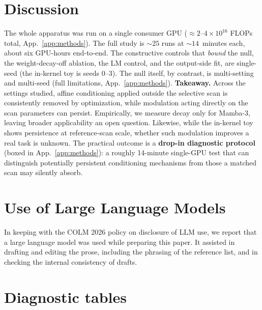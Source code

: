 \documentclass{article}
\begin{document}
\section{Discussion}\label{sec:discussion}

The whole apparatus was run on a single consumer GPU
(${\approx}2$--$4\times10^{16}$ FLOPs total, App.~\ref{app:methods}). The full
study is ${\sim}25$ runs at ${\sim}14$~minutes each, about six GPU-hours
end-to-end.
The constructive controls that \emph{bound}
the null, the weight-decay-off ablation, the LM control, and the output-side fit,
are single-seed (the in-kernel toy is seeds 0--3). The null itself, by contrast,
is multi-setting and multi-seed (full limitations, App.~\ref{app:methods}).
\textbf{Takeaway.} Across the settings studied, affine conditioning applied
outside the selective scan is consistently removed by optimization, while
modulation acting directly on the scan parameters can persist. Empirically, we
measure decay only for Mamba-3, leaving broader applicability an open question.  Likewise, while the in-kernel toy shows persistence at reference-scan
scale, whether such modulation improves a real task is unknown. The practical
outcome is a \textbf{drop-in diagnostic protocol} (boxed in
App.~\ref{app:methods}): a roughly 14-minute single-GPU test that can distinguish
potentially persistent conditioning mechanisms from those a matched scan may
silently absorb.

\section*{Use of Large Language Models}
In keeping with the COLM 2026 policy on disclosure of LLM use, we report that a large language model was used while preparing this paper. It assisted in drafting and editing the prose, including the phrasing of the reference list, and in checking the internal consistency of drafts.

\appendix
\section{Diagnostic tables}\label{app:tables}
\end{document}
